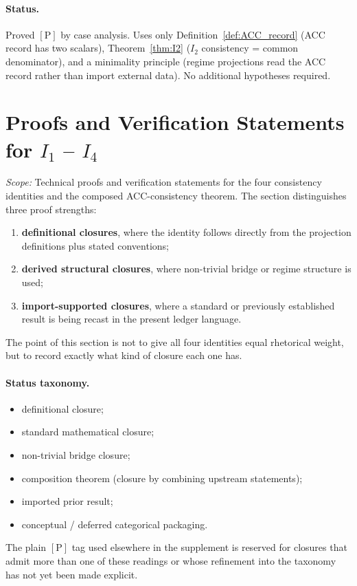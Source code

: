 \documentclass[11pt]{article}
\theoremstyle{plain}
\theoremstyle{definition}
\theoremstyle{remark}
\begin{document}
\paragraph{Status.}  Proved $[\text{P}]$ by case analysis.  Uses only Definition~\ref{def:ACC_record} (ACC record has two scalars), Theorem~\ref{thm:I2} ($I_2$ consistency = common denominator), and a minimality principle (regime projections read the ACC record rather than import external data).  No additional hypotheses required.

\section{Proofs and Verification Statements for \texorpdfstring{$I_1$ -- $I_4$}{I1--I4}}\label{supp:D}

\noindent\textit{Scope:} Technical proofs and verification statements for the four consistency identities and the composed ACC-consistency theorem.  The section distinguishes three proof strengths:
\begin{enumerate}[leftmargin=2.5em,label=\textup{(\roman*)}]
  \item \textbf{definitional closures}, where the identity follows directly from the projection definitions plus stated conventions;
  \item \textbf{derived structural closures}, where non-trivial bridge or regime structure is used;
  \item \textbf{import-supported closures}, where a standard or previously established result is being recast in the present ledger language.
\end{enumerate}
The point of this section is not to give all four identities equal rhetorical weight, but to record exactly what kind of closure each one has.

\paragraph{Status taxonomy.}
\begin{itemize}[leftmargin=2em,itemsep=2pt]
  \item[{$[\text{P}_{\mathrm{def}}]$}] definitional closure;
  \item[{$[\text{P}_{\mathrm{std}}]$}] standard mathematical closure;
  \item[{$[\text{P}_{\mathrm{bridge}}]$}] non-trivial bridge closure;
  \item[{$[\text{P}_{\mathrm{comp}}]$}] composition theorem (closure by combining upstream statements);
  \item[{$[\text{I}]$}] imported prior result;
  \item[{$[\text{C}]$}] conceptual / deferred categorical packaging.
\end{itemize}
The plain $[\text{P}]$ tag used elsewhere in the supplement is reserved for closures that admit more than one of these readings or whose refinement into the taxonomy has not yet been made explicit.
\end{document}
